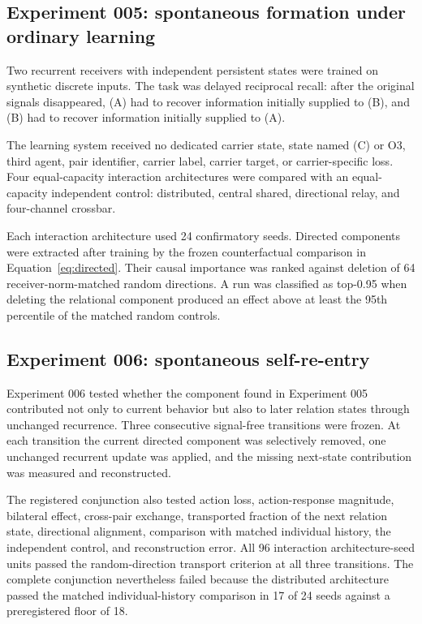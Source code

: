 \documentclass[11pt,a4paper]{article}
\begin{document}
\subsection{Experiment 005: spontaneous formation under ordinary learning}

Two recurrent receivers with independent persistent states were trained on synthetic discrete inputs. The task was delayed reciprocal recall: after the original signals disappeared, (A) had to recover information initially supplied to (B), and (B) had to recover information initially supplied to (A).

The learning system received no dedicated carrier state, state named (C) or O3, third agent, pair identifier, carrier label, carrier target, or carrier-specific loss. Four equal-capacity interaction architectures were compared with an equal-capacity independent control: distributed, central shared, directional relay, and four-channel crossbar.

Each interaction architecture used 24 confirmatory seeds. Directed components were extracted after training by the frozen counterfactual comparison in Equation~\eqref{eq:directed}. Their causal importance was ranked against deletion of 64 receiver-norm-matched random directions. A run was classified as top-0.95 when deleting the relational component produced an effect above at least the 95th percentile of the matched random controls.

\subsection{Experiment 006: spontaneous self-re-entry}

Experiment 006 tested whether the component found in Experiment 005 contributed not only to current behavior but also to later relation states through unchanged recurrence. Three consecutive signal-free transitions were frozen. At each transition the current directed component was selectively removed, one unchanged recurrent update was applied, and the missing next-state contribution was measured and reconstructed.

The registered conjunction also tested action loss, action-response magnitude, bilateral effect, cross-pair exchange, transported fraction of the next relation state, directional alignment, comparison with matched individual history, the independent control, and reconstruction error. All 96 interaction architecture-seed units passed the random-direction transport criterion at all three transitions. The complete conjunction nevertheless failed because the distributed architecture passed the matched individual-history comparison in 17 of 24 seeds against a preregistered floor of 18.
\end{document}
